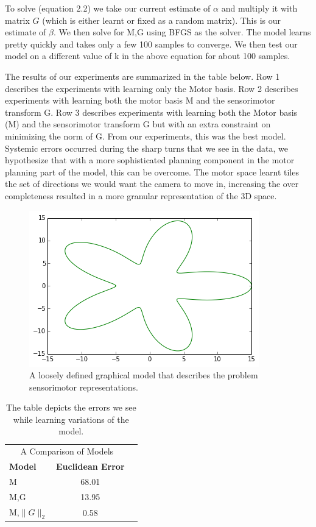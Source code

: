 \documentclass[conference]{IEEEtran}
\begin{document}
To solve (equation 2.2) we take our current estimate of $\alpha$ and multiply it with matrix $G$ (which is either learnt or fixed as a random matrix). This is our estimate of $\beta$. We then solve for M,G using BFGS as the solver. The model learns pretty quickly and takes only a few 100 samples to converge. We then test our model on a different value of k in the above equation for about 100 samples.

The results of our experiments are summarized in the table below. Row 1 describes the experiments with learning only the Motor basis. Row 2 describes experiments with learning both the motor basis M and the sensorimotor transform G. Row 3 describes experiments with learning both the Motor basis (M) and the sensorimotor transform G but with an extra constraint on minimizing the norm of G. From our experiments, this was the best model. Systemic errors occurred during the sharp turns that we see in the data, we hypothesize that with a more sophisticated planning component in the motor planning part of the model, this can be overcome. The motor space learnt tiles the set of directions we would want the camera to move in, increasing the over completeness resulted in a more granular representation of the 3D space.

\begin{figure}
\includegraphics[scale=0.6]{train1.png}
\caption{A loosely defined graphical model that describes the problem sensorimotor representations. }
\end{figure}

\begin{table}[htbp]
   \centering
   \begin{tabular}{@{} lcr @{}} %
      \multicolumn{2}{c}{A Comparison of Models } \\
      \textbf{Model}    & \textbf{Euclidean Error} \\
      \hline
      M      & 68.01 \\                
      M,G       &  13.95 \\
      M,$\|G\|_{2}$       & 0.58 \\
      
   \end{tabular}
   \caption{The table depicts the errors we see while learning variations of the model.}
   \label{tab:booktabs}
\end{table}
\end{document}
